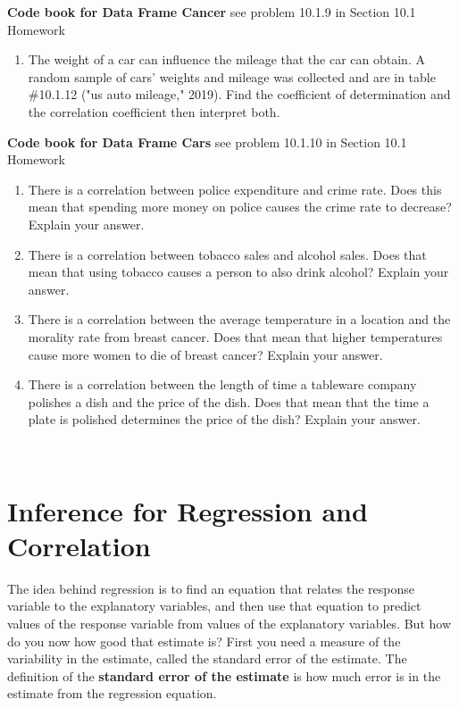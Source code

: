 \documentclass[]{book}
\providecommand{\tightlist}{%
  \setlength{\itemsep}{0pt}\setlength{\parskip}{0pt}}
\begin{document}
\textbf{Code book for Data Frame Cancer} see problem 10.1.9 in Section 10.1 Homework

\begin{enumerate}
\def\labelenumi{\arabic{enumi}.}
\setcounter{enumi}{9}
\tightlist
\item
  The weight of a car can influence the mileage that the car can obtain. A random sample of cars' weights and mileage was collected and are in table \#10.1.12 ("us auto mileage," 2019). Find the coefficient of determination and the correlation coefficient then interpret both.
\end{enumerate}

\textbf{Code book for Data Frame Cars} see problem 10.1.10 in Section 10.1 Homework

\begin{enumerate}
\def\labelenumi{\arabic{enumi}.}
\setcounter{enumi}{10}
\item
  There is a correlation between police expenditure and crime rate. Does this mean that spending more money on police causes the crime rate to decrease? Explain your answer.
\item
  There is a correlation between tobacco sales and alcohol sales. Does that mean that using tobacco causes a person to also drink alcohol? Explain your answer.
\item
  There is a correlation between the average temperature in a location and the morality rate from breast cancer. Does that mean that higher temperatures cause more women to die of breast cancer? Explain your answer.
\item
  There is a correlation between the length of time a tableware company polishes a dish and the price of the dish. Does that mean that the time a plate is polished determines the price of the dish? Explain your answer.
\end{enumerate}

\textbf{\\
}

\hypertarget{inference-for-regression-and-correlation}{%
\section{Inference for Regression and Correlation}\label{inference-for-regression-and-correlation}}

The idea behind regression is to find an equation that relates the response variable to the explanatory variables, and then use that equation to predict values of the response variable from values of the explanatory variables. But how do you now how good that estimate is? First you need a measure of the variability in the estimate, called the standard error of the estimate. The definition of the \textbf{standard error of the estimate} is how much error is in the estimate from the regression equation.
\end{document}
